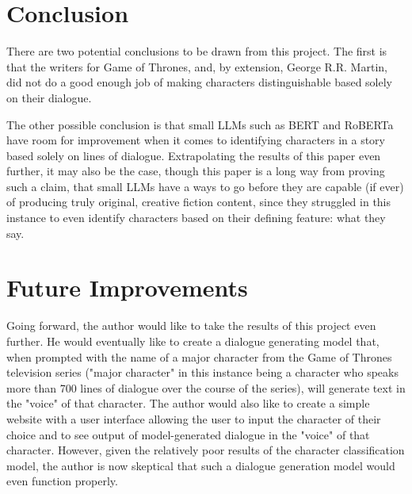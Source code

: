 \documentclass[11pt]{article}
\begin{document}
\section{Conclusion}

There are two potential conclusions to be drawn from this project. The first is that the writers for Game of Thrones, and, by extension, George R.R. Martin, did not do a good enough job of making characters distinguishable based solely on their dialogue.

The other possible conclusion is that small LLMs such as BERT and RoBERTa have room for improvement when it comes to identifying characters in a story based solely on lines of dialogue. Extrapolating the results of this paper even further, it may also be the case, though this paper is a long way from proving such a claim, that small LLMs have a ways to go before they are capable (if ever) of producing truly original, creative fiction content, since they struggled in this instance to even identify characters based on their defining feature: what they say.

\section{Future Improvements}

Going forward, the author would like to take the results of this project even further. He would eventually like to create a dialogue generating model that, when prompted with the name of a major character from the Game of Thrones television series ("major character" in this instance being a character who speaks more than 700 lines of dialogue over the course of the series), will generate text in the "voice" of that character. The author would also like to create a simple website with a user interface allowing the user to input the character of their choice and to see output of model-generated dialogue in the "voice" of that character. However, given the relatively poor results of the character classification model, the author is now skeptical that such a dialogue generation model would even function properly.



\end{document}
